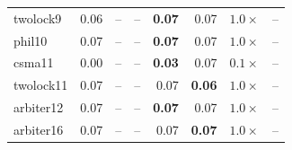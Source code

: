 \begin{table}[t]
\begin{tabular}{l r r r r r r r}
twolock9 & 0.06 & -- & -- & \textbf{0.07} & 0.07 & $1.0\times$ & -- \\
phil10 & 0.07 & -- & -- & \textbf{0.07} & 0.07 & $1.0\times$ & -- \\
csma11 & 0.00 & -- & -- & \textbf{0.03} & 0.07 & $0.1\times$ & -- \\
twolock11 & 0.07 & -- & -- & 0.07 & \textbf{0.06} & $1.0\times$ & -- \\
arbiter12 & 0.07 & -- & -- & \textbf{0.07} & 0.07 & $1.0\times$ & -- \\
arbiter16 & 0.07 & -- & -- & 0.07 & \textbf{0.07} & $1.0\times$ & -- \\
\bottomrule
\end{tabular}
\end{table}

